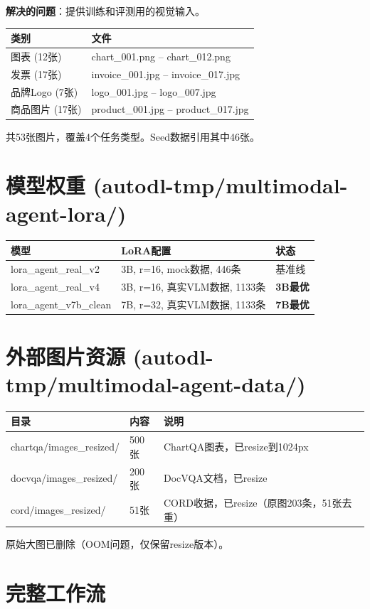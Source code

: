 \documentclass[fontset=none,11pt,a4paper]{ctexart}
\begin{document}
\textbf{解决的问题}：提供训练和评测用的视觉输入。

\begin{longtable}{lp{9cm}}
\toprule
类别 & 文件 \\
\midrule
图表 (12张) & chart\_001.png -- chart\_012.png \\
发票 (17张) & invoice\_001.jpg -- invoice\_017.jpg \\
品牌Logo (7张) & logo\_001.jpg -- logo\_007.jpg \\
商品图片 (17张) & product\_001.jpg -- product\_017.jpg \\
\bottomrule
\end{longtable}

共53张图片，覆盖4个任务类型。Seed数据引用其中46张。

\section{模型权重 (autodl-tmp/multimodal-agent-lora/)}

\begin{longtable}{lp{7cm}p{2.5cm}}
\toprule
模型 & LoRA配置 & 状态 \\
\midrule
lora\_agent\_real\_v2 & 3B, r=16, mock数据, 446条 & 基准线 \\
lora\_agent\_real\_v4 & 3B, r=16, 真实VLM数据, 1133条 & \textbf{3B最优} \\
lora\_agent\_v7b\_clean & 7B, r=32, 真实VLM数据, 1133条 & \textbf{7B最优} \\
\bottomrule
\end{longtable}

\section{外部图片资源 (autodl-tmp/multimodal-agent-data/)}

\begin{longtable}{lp{5cm}p{5cm}}
\toprule
目录 & 内容 & 说明 \\
\midrule
chartqa/images\_resized/ & 500张 & ChartQA图表，已resize到1024px \\
docvqa/images\_resized/ & 200张 & DocVQA文档，已resize \\
cord/images\_resized/ & 51张 & CORD收据，已resize（原图203条，51张去重） \\
\bottomrule
\end{longtable}

原始大图已删除（OOM问题，仅保留resize版本）。

\section{完整工作流}
\end{document}
